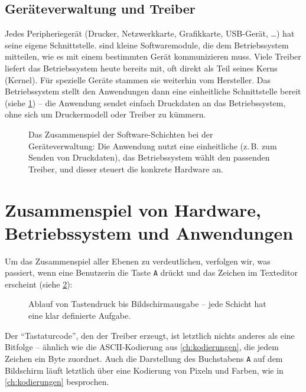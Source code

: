 \subsection{Geräteverwaltung und Treiber}

Jedes Peripheriegerät (Drucker, Netzwerkkarte, Grafikkarte, \gls{USB}-Gerät, \ldots) hat seine eigene Schnittstelle.  sind kleine Softwaremodule, die dem Betriebssystem mitteilen, wie es mit einem bestimmten Gerät kommunizieren muss. Viele Treiber liefert das Betriebssystem heute bereits mit, oft direkt als Teil seines Kerns (Kernel). Für spezielle Geräte stammen sie weiterhin vom Hersteller. Das Betriebssystem stellt den Anwendungen dann eine einheitliche Schnittstelle bereit (siehe \cref{fig:software_stack_detailliert}) -- die Anwendung sendet einfach Druckdaten an das Betriebssystem, ohne sich um Druckermodell oder Treiber zu kümmern.

\begin{figure}[H]
    \centering
    
    \caption{Das Zusammenspiel der Software-Schichten bei der Geräteverwaltung: Die Anwendung nutzt eine einheitliche  (z.\,B. zum Senden von Druckdaten), das Betriebssystem wählt den passenden Treiber, und dieser steuert die konkrete Hardware an.}
    \label{fig:software_stack_detailliert}
\end{figure}

\section{Zusammenspiel von Hardware, Betriebssystem und Anwendungen}

Um das Zusammenspiel aller Ebenen zu verdeutlichen, verfolgen wir, was passiert, wenn eine Benutzerin die Taste \texttt{A} drückt und das Zeichen im Texteditor erscheint (siehe \cref{fig:tastendruck}):

\begin{figure}[H]
    \centering
    
    \caption{Ablauf von Tastendruck bis Bildschirmausgabe -- jede Schicht hat eine klar definierte Aufgabe.}
    \label{fig:tastendruck}
\end{figure}

\begin{myattention}
    Der \enquote{Tastaturcode}, den der Treiber erzeugt, ist letztlich nichts anderes als eine Bitfolge -- ähnlich wie die \gls{ASCII}-Kodierung aus \cref{ch:kodierungen}, die jedem Zeichen ein Byte zuordnet. Auch die Darstellung des Buchstabens \texttt{A} auf dem Bildschirm läuft letztlich über eine Kodierung von Pixeln und Farben, wie in \cref{ch:kodierungen} besprochen.
\end{myattention}

